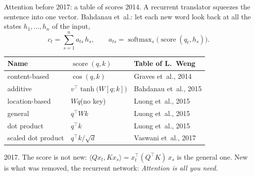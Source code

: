 \documentclass[10pt]{beamer}
\DeclareMathOperator{\softmax}{softmax}
\DeclareMathOperator{\score}{score}
\begin{document}
\begin{frame}{Attention before 2017: a table of scores}
\small
\alert{2014.} A recurrent translator squeezes the sentence into one vector. Bahdanau et~al.: let each new word look back at all the states $h_1,\dots,h_n$ of the input,
\[
c_t=\sum_{s=1}^n a_{ts}\,h_s,\qquad a_{ts}=\softmax_s\big(\score(q_t,h_s)\big).
\]

\footnotesize
{\centering
\renewcommand{\arraystretch}{1.15}
\begin{tabular}{@{}l l l@{}}
\toprule
\textbf{Name} & \textbf{$\score(q,k)$} & \textbf{Table of L.~Weng \citep{weng2018}} \\
\midrule
content-based & $\cos(q,k)$ & Graves et~al., 2014 \citep{graves2014} \\
additive & $v^\top\tanh\big(W[q;k]\big)$ & Bahdanau et~al., 2015 \citep{bahdanau2015} \\
location-based & $Wq$\quad (no key) & Luong et~al., 2015 \citep{luong2015} \\
general & $q^\top Wk$ & Luong et~al., 2015 \citep{luong2015} \\
dot product & $q^\top k$ & Luong et~al., 2015 \citep{luong2015} \\
\rowcolor{ctrl!12}\alert{scaled dot product} & $q^\top k/\sqrt d$ & Vaswani et~al., 2017 \citep{vaswani2017} \\
\bottomrule
\end{tabular}\par}

\smallskip
\small
\alert{2017.} The score is not new: $\langle Qx_t,Kx_s\rangle=x_t^\top(Q^\top K)\,x_s$ is the general one. New is what was removed, the recurrent network: \emph{Attention is all you need}.
\end{frame}
\end{document}
